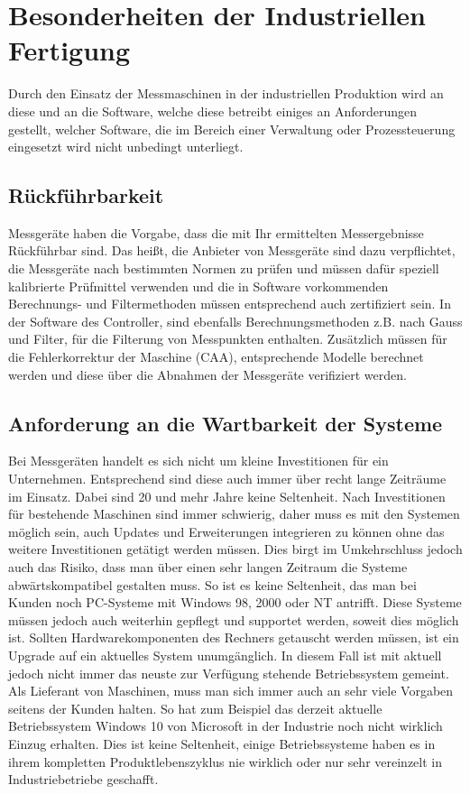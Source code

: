 \section{Besonderheiten der Industriellen Fertigung}
Durch den Einsatz der Messmaschinen in der industriellen Produktion wird an diese und an die Software, welche diese betreibt einiges an Anforderungen gestellt, welcher Software, die im Bereich einer Verwaltung oder Prozessteuerung eingesetzt wird nicht unbedingt unterliegt.

\subsection{Rückführbarkeit}

Messgeräte haben die Vorgabe, dass die mit Ihr ermittelten Messergebnisse Rückführbar sind. Das heißt, die Anbieter von Messgeräte sind dazu verpflichtet, die Messgeräte nach bestimmten Normen zu prüfen und müssen dafür speziell kalibrierte Prüfmittel verwenden und die in Software vorkommenden Berechnungs- und Filtermethoden müssen entsprechend auch zertifiziert sein. In der Software des Controller, sind ebenfalls Berechnungsmethoden z.B. nach Gauss und Filter, für die Filterung von Messpunkten enthalten. Zusätzlich müssen für die Fehlerkorrektur der Maschine (CAA), entsprechende Modelle berechnet werden und diese über die Abnahmen der Messgeräte verifiziert werden.

\subsection{Anforderung an die Wartbarkeit der Systeme}

Bei Messgeräten handelt es sich nicht um kleine Investitionen für ein Unternehmen. Entsprechend sind diese auch immer über recht lange Zeiträume im Einsatz. Dabei sind 20 und mehr Jahre keine Seltenheit. Nach Investitionen für bestehende Maschinen sind immer schwierig, daher muss es mit den Systemen möglich sein, auch Updates und Erweiterungen integrieren zu können ohne das weitere Investitionen getätigt werden müssen. Dies birgt im Umkehrschluss jedoch auch das Risiko, dass man über einen sehr langen Zeitraum die Systeme abwärtskompatibel gestalten muss. So ist es keine Seltenheit, das man bei Kunden noch PC-Systeme mit Windows 98, 2000 oder NT antrifft. Diese Systeme müssen jedoch auch weiterhin gepflegt und supportet werden, soweit dies möglich ist. Sollten Hardwarekomponenten des Rechners getauscht werden müssen, ist ein Upgrade auf ein aktuelles System unumgänglich. In diesem Fall ist mit aktuell jedoch nicht immer das neuste zur Verfügung stehende Betriebssystem gemeint. Als Lieferant von Maschinen, muss man sich immer auch an sehr viele Vorgaben seitens der Kunden halten. So hat zum Beispiel das derzeit aktuelle Betriebssystem Windows 10 von Microsoft in der Industrie noch nicht wirklich Einzug erhalten. Dies ist keine Seltenheit, einige Betriebssysteme haben es in ihrem kompletten Produktlebenszyklus nie wirklich oder nur sehr vereinzelt in Industriebetriebe geschafft.

